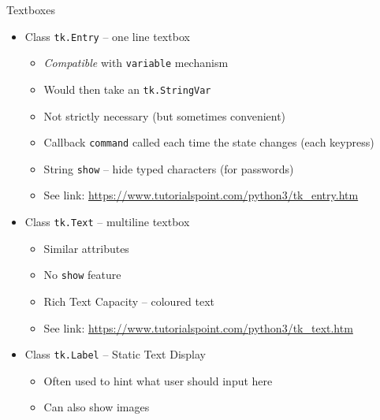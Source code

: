 \begin{frame}[fragile]{Textboxes}
%
%
\begin{itemize}
\item Class \texttt{tk.Entry} -- one line textbox
	\begin{itemize}
	\item \emph{Compatible} with \texttt{variable} mechanism
	\item Would then take an \texttt{tk.StringVar}
	\item Not strictly necessary (but sometimes convenient)
	\item Callback \texttt{command} called each time the state changes (each keypress)
	\item String \texttt{show} -- hide typed characters (for passwords)
	\item See link: {\scriptsize \url{https://www.tutorialspoint.com/python3/tk_entry.htm}}
	\end{itemize}
\item Class \texttt{tk.Text} -- multiline textbox
	\begin{itemize}
	\item Similar attributes
	\item No \texttt{show} feature
	\item Rich Text Capacity -- \zB coloured text
	\item See link: {\scriptsize \url{https://www.tutorialspoint.com/python3/tk_text.htm}}
	\end{itemize}
\item Class \texttt{tk.Label} -- Static Text Display
	\begin{itemize}
	\item Often used to hint what user should input here
	\item Can also show images
	\end{itemize}
\end{itemize}
%
\end{frame}


